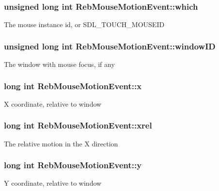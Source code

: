 \subsubsection[{\texorpdfstring{which}{which}}]{\setlength{\rightskip}{0pt plus 5cm}unsigned long int Reb\+Mouse\+Motion\+Event\+::which}\hypertarget{struct_reb_mouse_motion_event_a360617a3a516627fee7f0eccdaf9a3b2}{}\label{struct_reb_mouse_motion_event_a360617a3a516627fee7f0eccdaf9a3b2}
The mouse instance id, or S\+D\+L\+\_\+\+T\+O\+U\+C\+H\+\_\+\+M\+O\+U\+S\+E\+ID 
\subsubsection[{\texorpdfstring{window\+ID}{windowID}}]{\setlength{\rightskip}{0pt plus 5cm}unsigned long int Reb\+Mouse\+Motion\+Event\+::window\+ID}\hypertarget{struct_reb_mouse_motion_event_a3d59b67b8f82a0a68a461c671350116c}{}\label{struct_reb_mouse_motion_event_a3d59b67b8f82a0a68a461c671350116c}
The window with mouse focus, if any 
\subsubsection[{\texorpdfstring{x}{x}}]{\setlength{\rightskip}{0pt plus 5cm}long int Reb\+Mouse\+Motion\+Event\+::x}\hypertarget{struct_reb_mouse_motion_event_a42e7e532f6f42157cc18c05ea401ed29}{}\label{struct_reb_mouse_motion_event_a42e7e532f6f42157cc18c05ea401ed29}
X coordinate, relative to window 
\subsubsection[{\texorpdfstring{xrel}{xrel}}]{\setlength{\rightskip}{0pt plus 5cm}long int Reb\+Mouse\+Motion\+Event\+::xrel}\hypertarget{struct_reb_mouse_motion_event_a82f4063d5de6d4be3c9e3fd4c04e6bab}{}\label{struct_reb_mouse_motion_event_a82f4063d5de6d4be3c9e3fd4c04e6bab}
The relative motion in the X direction 
\subsubsection[{\texorpdfstring{y}{y}}]{\setlength{\rightskip}{0pt plus 5cm}long int Reb\+Mouse\+Motion\+Event\+::y}\hypertarget{struct_reb_mouse_motion_event_afae2d64ddb620d96f6e563661f3907c9}{}\label{struct_reb_mouse_motion_event_afae2d64ddb620d96f6e563661f3907c9}
Y coordinate, relative to window 
